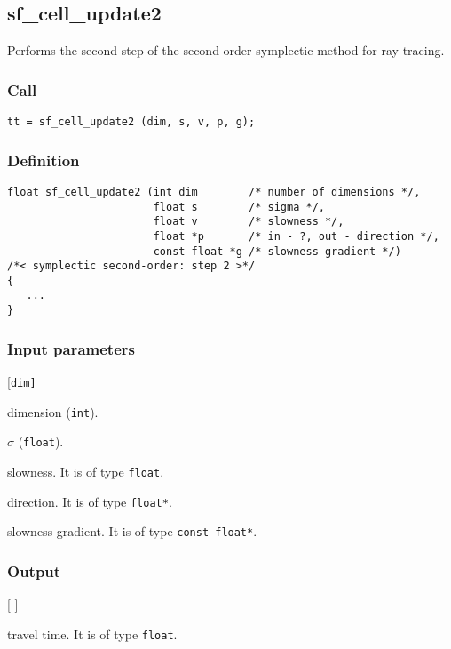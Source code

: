 \subsection{{sf\_cell\_update2}}
Performs the second step of the second order symplectic method for ray tracing.

\subsubsection*{Call}
\begin{verbatim}tt = sf_cell_update2 (dim, s, v, p, g);\end{verbatim}

\subsubsection*{Definition}
\begin{verbatim}
float sf_cell_update2 (int dim        /* number of dimensions */, 
                       float s        /* sigma */, 
                       float v        /* slowness */, 
                       float *p       /* in - ?, out - direction */, 
                       const float *g /* slowness gradient */) 
/*< symplectic second-order: step 2 >*/
{
   ...
}
\end{verbatim}

\subsubsection*{Input parameters}
\begin{desclist}{\tt }{\quad}[\tt dim]
   \setlength\itemsep{0pt}
   \item[dim] dimension (\texttt{int}).  
   \item[s]   $\sigma$ (\texttt{float}).
   \item[v]   slowness. It is of type \texttt{float}.
   \item[p]   direction. It is of type \texttt{float*}.
   \item[g]   slowness gradient. It is of type \texttt{const float*}.
\end{desclist}

\subsubsection*{Output}
\begin{desclist}{ }{\quad}[ ]
   \setlength\itemsep{0pt}  
   \item[0.5*v*v*s*(1. - s*pg)] travel time. It is of type \texttt{float}.
\end{desclist}





